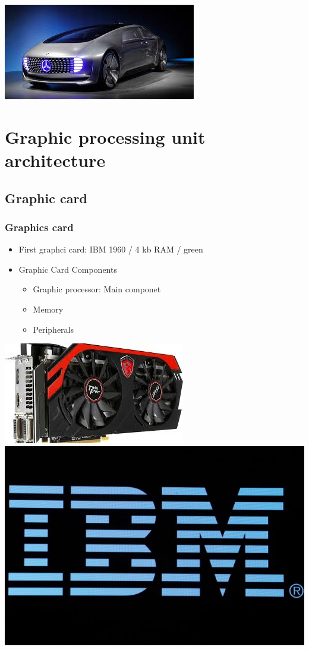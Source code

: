 \documentclass{beamer}
\begin{document}
\begin{frame}
\includegraphics[scale=0.3]{Benz}
\end{frame}
\section{Graphic processing unit architecture}
\subsection{Graphic card}
\begin{frame}
	\frametitle{Graphics card}
	\begin{itemize}
		\item {First graphci card: IBM 1960 / 4 kb RAM / green}
		\item {Graphic Card Components}
		\begin{itemize}
			\item {Graphic processor: Main componet}
			\item {Memory}
			\item {Peripherals}
		\end{itemize}
	\end{itemize}
\includegraphics[scale=0.55]{graphiccard}
\includegraphics[scale=0.3]{ibm}
\end{frame}
\end{document}
